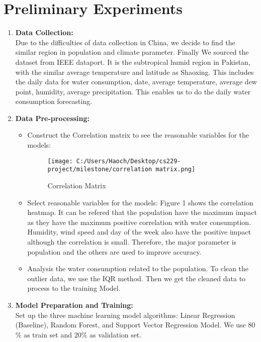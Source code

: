 \documentclass[12pt]{article}
\begin{document}
\section*{Preliminary Experiments}
\begin{enumerate}

    \item \textbf{Data Collection:}\\
    Due to the difficulties of data collection in China, we decide to find the similar region in population and climate parameter. Finally We sourced the dataset from IEEE dataport. It is the subtropical humid 
    region in Pakistan, with the similar average temperature and latitude as Shaoxing. This includes the daily data for water consumption, date, average temperature, average dew point, humidity, average precipitation.
    This enables us to do the daily water consumption forecasting. 


    \item \textbf{Data Pre-processing:}
    \begin{itemize}
        \item Construct the Correlation matrix to see the reasonable variables for the models:\\
        \begin{figure}[htb!]
            \centering
            \texttt{[image: C:/Users/Haoch/Desktop/cs229-project/milestone/correlation matrix.png]}
            \caption{Correlation Matrix }
            \label{fig:Correlation}
        \end{figure}
        \item Select reasonable variables for the models: Figure 1 shows the correlation heatmap. It can be refered that the population have the maximum impact as they have 
        the maximum positive correlation with water consumption. Humidity, wind speed and day of the week also have the positive impact although the correlation is small. Therefore,
        the major parameter is population and the others are used to improve accuracy. 
        \item Analysis the water consumption related to the population. To clean the outlier data, we use the IQR method. Then we get the cleaned data to process to the training Model.
    \end{itemize}

    \item \textbf{Model Preparation and Training:}\\
        Set up the three machine learning model algorithms: Linear Regression (Baseline), Random Forest, and Support Vector Regression Model. We use 80 $\%$ as train set and 20$\%$ as validation set.\\


\end{enumerate}
\end{document}
